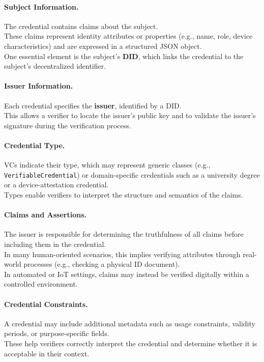 \paragraph{Subject Information.}
The credential contains claims about the subject. \\ 
These claims represent identity attributes or properties (e.g., name, role, device characteristics) and are expressed in a structured JSON object. \\
One essential element is the subject’s \textbf{DID}, which links the credential to the subject’s decentralized identifier.

\paragraph{Issuer Information.}
Each credential specifies the \textbf{issuer}, identified by a DID.\\  
This allows a verifier to locate the issuer’s public key and to validate the issuer’s signature during the verification process.

\paragraph{Credential Type.}
VCs indicate their type, which may represent generic classes (e.g., 
\texttt{VerifiableCredential}) or domain-specific credentials such as a university degree or a device-attestation credential. \\ 
Types enable verifiers to interpret the structure and semantics of the claims.

\paragraph{Claims and Assertions.}
The issuer is responsible for determining the truthfulness of all claims before including them in the credential. \\ 
In many human-oriented scenarios, this implies verifying attributes through real-world processes (e.g., checking a physical ID document). \\ 
In automated or IoT settings, claims may instead be verified digitally within a controlled environment.

\paragraph{Credential Constraints.}
A credential may include additional metadata such as usage constraints, validity periods, or purpose-specific fields. \\ 
These help verifiers correctly interpret the credential and determine whether it is acceptable in their context.

